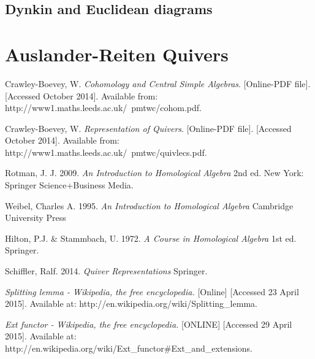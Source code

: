 \documentclass[11.5pt, twoside, a4paper, titlepage]{report}
\theoremstyle{definition}
\theoremstyle{plain}
\begin{document}
\section{Dynkin and Euclidean diagrams}


\chapter{Auslander-Reiten Quivers}














\begin{thebibliography}{99}

Crawley-Boevey, W.
\emph{Cohomology and Central Simple Algebras}. [Online-PDF file]. [Accessed October 2014].
Available from: http://www1.maths.leeds.ac.uk/~pmtwc/cohom.pdf.

Crawley-Boevey, W.
\emph{Representation of Quivers}. [Online-PDF file]. [Accessed October 2014].
Available from: http://www1.maths.leeds.ac.uk/~pmtwc/quivlecs.pdf.

Rotman, J. J.
2009.
\emph{An Introduction to Homological Algebra}
2nd ed.
New York: Springer Science+Business Media.

Weibel, Charles A.
1995.
\emph{An Introduction to Homological Algebra}
Cambridge University Press

Hilton, P.J. \& Stammbach, U.
1972.
\emph{A Course in Homological Algebra}
1st ed.
Springer.

Schiffler, Ralf.
2014.
\emph{Quiver Representations}
Springer.

\emph{Splitting lemma - Wikipedia, the free encyclopedia.} [Online]  [Accessed 23 April 2015].
Available at: http://en.wikipedia.org/wiki/Splitting\_lemma.

\emph{Ext functor - Wikipedia, the free encyclopedia.} [ONLINE]  [Accessed 29 April 2015].
Available at: http://en.wikipedia.org/wiki/Ext\_functor\#Ext\_and\_extensions.



\end{thebibliography}
\end{document}
